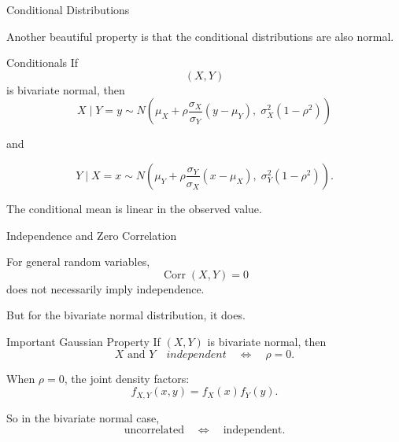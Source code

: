 \begin{frame}{Conditional Distributions}

Another beautiful property is that the conditional distributions are also normal.

\begin{keybox}{Conditionals}
If
\[
(X,Y)
\]
is bivariate normal, then
\[
\boxed{
X\mid Y=y
\sim
N
\left(
\mu_X
+
\rho\frac{\sigma_X}{\sigma_Y}(y-\mu_Y),
\;
\sigma_X^2(1-\rho^2)
\right)
}
\]

and

\[
\boxed{
Y\mid X=x
\sim
N
\left(
\mu_Y
+
\rho\frac{\sigma_Y}{\sigma_X}(x-\mu_X),
\;
\sigma_Y^2(1-\rho^2)
\right).
}
\]
\end{keybox}

\vspace{0.2cm}

The conditional mean is linear in the observed value.

\end{frame}




\begin{frame}{Independence and Zero Correlation}

For general random variables,
\[
\operatorname{Corr}(X,Y)=0
\]
does not necessarily imply independence.

\vspace{0.25cm}

But for the bivariate normal distribution, it does.

\begin{keybox}{Important Gaussian Property}
If $(X,Y)$ is bivariate normal, then
\[
\boxed{
X \text{ and } Y \quad independent
\quad\Longleftrightarrow\quad
\rho=0.
}
\]
\end{keybox}

\vspace{0.25cm}

When $\rho=0$, the joint density factors:
\[
f_{X,Y}(x,y)
=
f_X(x)f_Y(y).
\]

So in the bivariate normal case,
\[
\text{uncorrelated}
\quad\Longleftrightarrow\quad
\text{independent}.
\]

\end{frame}



















